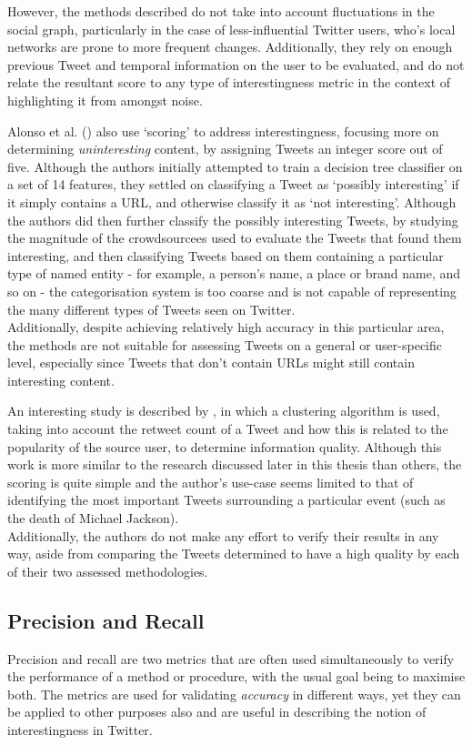 However, the methods described do not take into account fluctuations in the social graph, particularly in the case of less-influential Twitter users, who's local networks are prone to more frequent changes. Additionally, they rely on enough previous Tweet and temporal information on the user to be evaluated, and do not relate the resultant score to any type of interestingness metric in the context of highlighting it from amongst noise.

Alonso et al. (\cite{alonso10}) also use `scoring' to address interestingness, focusing more on determining \textit{uninteresting} content, by assigning Tweets an integer score out of five. Although the authors initially attempted to train a decision tree classifier on a set of 14 features, they settled on classifying a Tweet as `possibly interesting' if it simply contains a URL, and otherwise classify it as `not interesting'. Although the authors did then further classify the possibly interesting Tweets, by studying the magnitude of the crowdsourcees used to evaluate the Tweets that found them interesting, and then classifying Tweets based on them containing a particular type of named entity - for example, a person's name, a place or brand name, and so on - the categorisation system is too coarse and is not capable of representing the many different types of Tweets seen on Twitter.\\
Additionally, despite achieving relatively high accuracy in this particular area, the methods are not suitable for assessing Tweets on a general or user-specific level, especially since Tweets that don't contain URLs might still contain interesting content.

An interesting study is described by \cite{lauw10}, in which a clustering algorithm is used, taking into account the retweet count of a Tweet and how this is related to the popularity of the source user, to determine information quality. Although this work is more similar to the research discussed later in this thesis than others, the scoring is quite simple and the author's use-case seems limited to that of identifying the most important Tweets surrounding a particular event (such as the death of Michael Jackson).\\
Additionally, the authors do not make any effort to verify their results in any way, aside from comparing the Tweets determined to have a high quality by each of their two assessed methodologies.


\subsection{Precision and Recall}
Precision and recall are two metrics that are often used simultaneously to verify the performance of a method or procedure, with the usual goal being to maximise both. The metrics are used for validating \textit{accuracy} in different ways, yet they can be applied to other purposes also and are useful in describing the notion of interestingness in Twitter.

